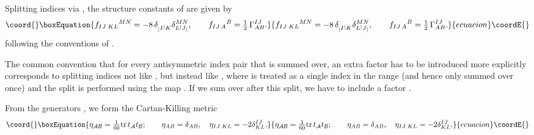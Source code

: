 \documentclass[a4paper,12pt]{article}
\begin{document}
Splitting \coordHE{} indices \coordHE{} via
\coordHE{}, the structure constants of \coordHE{} are
given by
\begin{equation}\coord{}\boxEquation{
f_{IJ\;KL}{}^{MN}=-8\,\delta_{{}_[I{}^[K}^{\phantom{MN}}\delta_{L{}^]J{}_]}^{MN},\qquad
f_{IJ\,A}{}^{B}={\textstyle \frac{1}{2}}\,\Gamma^{IJ}_{AB}.
}{
f_{IJ\;KL}{}^{MN}=-8\,\delta_{{}_[I{}^[K}^{\phantom{MN}}\delta_{L{}^]J{}_]}^{MN},\qquad
f_{IJ\,A}{}^{B}={\textstyle \frac{1}{2}}\,\Gamma^{IJ}_{AB}.
}{ecuacion}\coordE{}\end{equation}
following the conventions of \cite{Nicolai:2000sc, Nicolai:2001sv}.

The common convention that for every antisymmetric index pair \myHighlight{$[IJ]$}\coordHE{}
that is summed over, an extra factor \coordHE{} has to be
introduced more explicitly corresponds to splitting \coordHE{}
indices not like \coordHE{}, but instead like
\coordHE{}, where
\myHighlight{$\underline{[IJ]}$}\coordHE{} is treated as a single index in the range
\coordHE{} (and hence only summed over once) and the split
\myHighlight{$\underline{[IJ]}\rightarrow[IJ]$}\coordHE{} is performed using the map
\coordHE{}. If we sum over
\myHighlight{$[IJ]$}\coordHE{} after this split, we have to include a factor \coordHE{}.

From the generators
\coordHE{},
we form the Cartan-Killing metric
\begin{equation}\coord{}\boxEquation{
\eta_{\mathcal{A}\mathcal{B}}={\textstyle \frac{1}{60}}\tr t_\mathcal{A}t_\mathcal{B};\qquad\eta_{AB}=\delta_{AB},\quad\eta_{IJ\;KL}=-2\delta^{IJ}_{KL}.
}{
\eta_{\mathcal{A}\mathcal{B}}={\textstyle \frac{1}{60}}\tr t_\mathcal{A}t_\mathcal{B};\qquad\eta_{AB}=\delta_{AB},\quad\eta_{IJ\;KL}=-2\delta^{IJ}_{KL}.
}{ecuacion}\coordE{}\end{equation}
\end{document}
